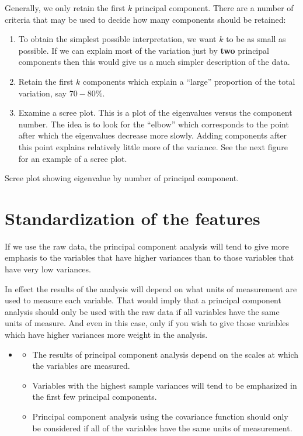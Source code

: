 \documentclass[]{book}
\providecommand{\tightlist}{%
  \setlength{\itemsep}{0pt}\setlength{\parskip}{0pt}}
\newenvironment{rmdblock}[1]
  {\begin{shaded*}
  \begin{itemize}
  \renewcommand{\labelitemi}{
    \raisebox{-.7\height}[0pt][0pt]{
      {\setkeys{Gin}{width=2em,keepaspectratio}\texttt{[image: img/icons/\#1]}}
    }
  }
  \item
  }
  {
  \end{itemize}
  \end{shaded*}
  }
\newenvironment{rmdcaution}
  {\begin{rmdblock}{caution}}
  {\end{rmdblock}}
\begin{document}
Generally, we only retain the first \(k\) principal component. There are
a number of criteria that may be used to decide how many components
should be retained:

\begin{enumerate}
\def\labelenumi{\arabic{enumi}.}
\item
  To obtain the simplest possible interpretation, we want \(k\) to be as
  small as possible. If we can explain most of the variation just by
  \textbf{two} principal components then this would give us a much
  simpler description of the data.
\item
  Retain the first \(k\) components which explain a ``large'' proportion
  of the total variation, say \(70-80\%\).
\item
  Examine a scree plot. This is a plot of the eigenvalues versus the
  component number. The idea is to look for the ``elbow'' which
  corresponds to the point after which the eigenvalues decrease more
  slowly. Adding components after this point explains relatively little
  more of the variance. See the next figure for an example of a scree
  plot.
\end{enumerate}

Scree plot showing eigenvalue by number of principal component.

\section{Standardization of the
features}\label{standardization-of-the-features}

If we use the raw data, the principal component analysis will tend to
give more emphasis to the variables that have higher variances than to
those variables that have very low variances.

In effect the results of the analysis will depend on what units of
measurement are used to measure each variable. That would imply that a
principal component analysis should only be used with the raw data if
all variables have the same units of measure. And even in this case,
only if you wish to give those variables which have higher variances
more weight in the analysis.

\begin{rmdcaution}
\begin{itemize}
\tightlist
\item
  The results of principal component analysis depend on the scales at
  which the variables are measured.
\item
  Variables with the highest sample variances will tend to be emphasized
  in the first few principal components.
\item
  Principal component analysis using the covariance function should only
  be considered if all of the variables have the same units of
  measurement.
\end{itemize}
\end{rmdcaution}
\end{document}
